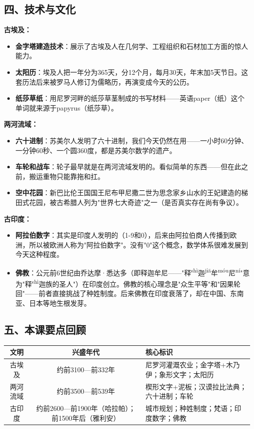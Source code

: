 \documentclass[a4paper,12pt]{ctexart}
\newcommand{\ruby}[2]{#1\textsuperscript{#2}}
\begin{document}
\subsection*{四、技术与文化}

\textbf{古埃及：}
\begin{itemize}
  \item \textbf{金字塔建造技术}：展示了古埃及人在几何学、工程组织和石材加工方面的惊人能力。
  \item \textbf{太阳历}：埃及人把一年分为365天，分12个月，每月30天，年末加5天节日。这套历法后来被罗马人修订为儒略历，再演变成今天的公历。
  \item \textbf{纸莎草纸}：用尼罗河畔的纸莎草茎制成的书写材料——英语paper（纸）这个单词就来源于papyrus（纸莎草）。
\end{itemize}

\textbf{两河流域：}
\begin{itemize}
  \item \textbf{六十进制}：苏美尔人发明了六十进制，我们今天仍然在用——一小时60分钟、一分钟60秒、一个圆360度，都是苏美尔数学的遗产。
  \item \textbf{车轮和战车}：轮子最早就是在两河流域发明的。看似简单的东西——但在此之前，搬运重物只能靠拖和扛。
  \item \textbf{空中花园}：新巴比伦王国国王尼布甲尼撒二世为思念家乡山水的王妃建造的梯田式花园，被古希腊人列为"世界七大奇迹"之一（是否真实存在尚有争议）。
\end{itemize}

\textbf{古印度：}
\begin{itemize}
  \item \textbf{阿拉伯数字}：其实是印度人发明的（1-9和0），后来由阿拉伯商人传播到欧洲，所以被欧洲人称为"阿拉伯数字"。没有"0"这个概念，数学体系很难发展到今天这种程度。
  \item \textbf{佛教}：公元前6世纪由乔达摩·悉达多（即释迦牟尼——"\ruby{释}{shì}\ruby{迦}{jiā}\ruby{牟}{móu}\ruby{尼}{ní}"意为"\ruby{释}{shì}迦族的圣人"）在印度创立。佛教的核心理念是"众生平等"和"因果轮回"——前者直接挑战了种姓制度。后来佛教在印度衰落了，却在中国、东南亚、日本等地生根发芽。
\end{itemize}

\subsection*{五、本课要点回顾}

\begin{center}
\begin{tabular}{|c|c|p{7cm}|}
\hline
\textbf{文明} & \textbf{兴盛年代} & \textbf{核心标识} \\
\hline
古埃及 & 约前3100—前332年 & 尼罗河灌溉农业；金字塔+木乃伊；象形文字；太阳历 \\
\hline
两河流域 & 约前3500—前539年 & 楔形文字+泥板；汉谟拉比法典；六十进制；车轮 \\
\hline
古印度 & 约前2600—前1900年（哈拉帕）；前1500年后（雅利安） & 城市规划；种姓制度；梵语；印度数字；佛教 \\
\hline
\end{tabular}
\end{center}
\end{document}
